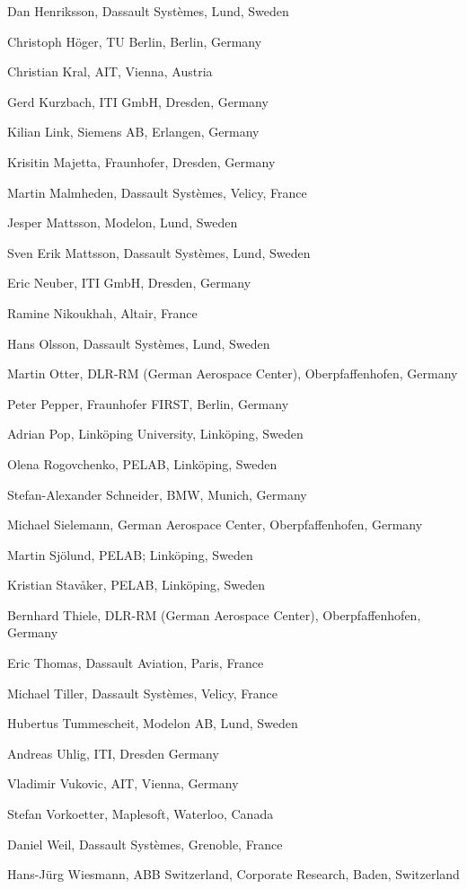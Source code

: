 \documentclass[10pt,a4paper]{report}
\begin{document}
Dan Henriksson, Dassault Systèmes, Lund, Sweden

Christoph Höger, TU Berlin, Berlin, Germany

Christian Kral, AIT, Vienna, Austria

Gerd Kurzbach, ITI GmbH, Dresden, Germany

Kilian Link, Siemens AB, Erlangen, Germany

Krisitin Majetta, Fraunhofer, Dresden, Germany

Martin Malmheden, Dassault Systèmes, Velicy, France

Jesper Mattsson, Modelon, Lund, Sweden

Sven Erik Mattsson, Dassault Systèmes, Lund, Sweden

Eric Neuber, ITI GmbH, Dresden, Germany

Ramine Nikoukhah, Altair, France

Hans Olsson, Dassault Systèmes, Lund, Sweden

Martin Otter, DLR-RM (German Aerospace Center), Oberpfaffenhofen,
Germany

Peter Pepper, Fraunhofer FIRST, Berlin, Germany

Adrian Pop, Linköping University, Linköping, Sweden

Olena Rogovchenko, PELAB, Linköping, Sweden

Stefan-Alexander Schneider, BMW, Munich, Germany

Michael Sielemann, German Aerospace Center, Oberpfaffenhofen, Germany

Martin Sjölund, PELAB; Linköping, Sweden

Kristian Stavåker, PELAB, Linköping, Sweden

Bernhard Thiele, DLR-RM (German Aerospace Center), Oberpfaffenhofen,
Germany

Eric Thomas, Dassault Aviation, Paris, France

Michael Tiller, Dassault Systèmes, Velicy, France

Hubertus Tummescheit, Modelon AB, Lund, Sweden

Andreas Uhlig, ITI, Dresden Germany

Vladimir Vukovic, AIT, Vienna, Germany

Stefan Vorkoetter, Maplesoft, Waterloo, Canada

Daniel Weil, Dassault Systèmes, Grenoble, France

Hans-Jürg Wiesmann, ABB Switzerland, Corporate Research, Baden,
Switzerland
\end{document}

